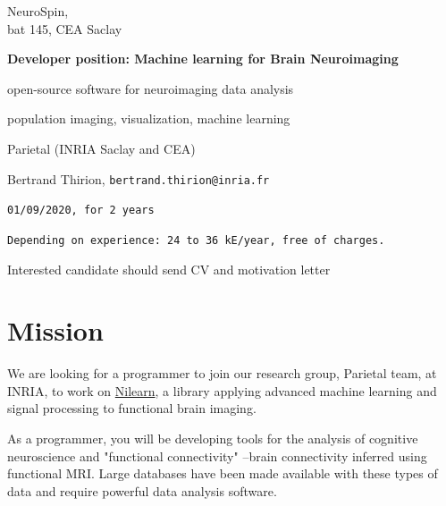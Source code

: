 \documentclass{article}
\def\bsf{\bfseries\sffamily}
\begin{document}
    \hfill%
    \begin{minipage}{.35\linewidth}
    \sf\flushright\vspace*{-1em}
    NeuroSpin, \\
    \small bat 145, CEA Saclay
    \end{minipage}
    \bigskip
    \vspace{5mm}
\centerline{\bsf\Large
Developer position: Machine learning for Brain Neuroimaging
}
\bigskip
\setlength{\parindent}{0pt}%
\enlargethispage{3em}
\hfill%
\begin{minipage}{.9\linewidth}
  \hspace*{-2em}{\bsf Main topic:} open-source software for neuroimaging data analysis
  
\hspace*{-2em}{\bsf Keywords:} population imaging, visualization, machine learning


\hspace*{-2em}{\bsf Research team:} Parietal (INRIA Saclay and CEA)

\hspace*{-2em}{\bsf Contact:} {Bertrand Thirion, {\tt bertrand.thirion@inria.fr}}

\hspace*{-2em}{\bsf Start and duration of contract:} {\tt 01/09/2020, for 2 years}

\hspace*{-2em}{\bsf Salary:} {\tt Depending on experience: 24 to 36 kE/year, free of charges.}

\hspace*{-2em}{\bsf Application:} Interested candidate should send CV and
motivation letter


\end{minipage}

\bigskip

\section*{Mission}

We are looking for a programmer to join our research group, Parietal
team, at INRIA, to work on \href{http://nilearn.github.io}{Nilearn}, a
library applying advanced machine learning and signal processing to
functional brain imaging.

As a programmer, you will be developing tools for the analysis of
cognitive neuroscience and "functional connectivity" --brain
connectivity inferred using functional MRI. Large databases have been
made available with these types of data and require powerful data
analysis software.
\end{document}
